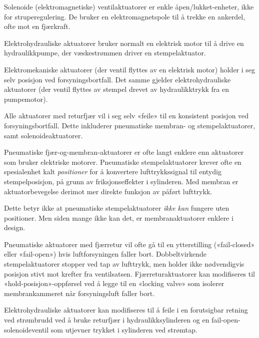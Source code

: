 \vskip 10pt

Solenoide (elektromagnetiske) ventilaktuatorer er enkle åpen/lukket-enheter, ikke for struperegulering. De bruker en elektromagnetspole til å trekke en ankerdel, ofte mot en fjærkraft.

\vskip 10pt

Elektrohydrauliske aktuatorer bruker normalt en elektrisk motor til å drive en hydraulikkpumpe, der væskestrømmen driver en stempelaktuator.

\vskip 10pt

Elektromekaniske aktuatorer (der ventil flyttes av en elektrisk motor) holder i seg selv posisjon ved forsyningsbortfall. Det samme gjelder elektrohydrauliske aktuatorer (der ventil flyttes av stempel drevet av hydraulikktrykk fra en pumpemotor).

\vskip 10pt

Alle aktuatorer med returfjær vil i seg selv «feile» til en konsistent posisjon ved forsyningsbortfall. Dette inkluderer pneumatiske membran- og stempelaktuatorer, samt solenoideaktuatorer.







Pneumatiske fjær-og-membran-aktuatorer er ofte langt enklere enn aktuatorer som bruker elektriske motorer. Pneumatiske stempelaktuatorer krever ofte en spesialenhet kalt {\it positioner} for å konvertere lufttrykkssignal til entydig stempelposisjon, på grunn av friksjonseffekter i sylinderen. Med membran er aktuatorbevegelse derimot mer direkte funksjon av påført lufttrykk.

Dette betyr ikke at pneumatiske stempelaktuatorer {\it ikke kan} fungere uten positioner. Men siden mange ikke kan det, er membranaktuatorer enklere i design.

\vskip 10pt

Pneumatiske aktuatorer med fjærretur vil ofte gå til en ytterstilling («fail-closed» eller «fail-open») hvis luftforsyningen faller bort. Dobbeltvirkende stempelaktuatorer stopper ved tap av lufttrykk, men holder ikke nødvendigvis posisjon stivt mot krefter fra ventilsatsen. Fjærreturaktuatorer kan modifiseres til «hold-posisjon»-oppførsel ved å legge til en «locking valve» som isolerer membrankammeret når forsyningsluft faller bort.

\vskip 10pt

Elektrohydrauliske aktuatorer kan modifiseres til å feile i en forutsigbar retning ved strømbrudd ved å bruke returfjær i hydraulikksylinderen og en fail-open-solenoideventil som utjevner trykket i sylinderen ved strømtap.




